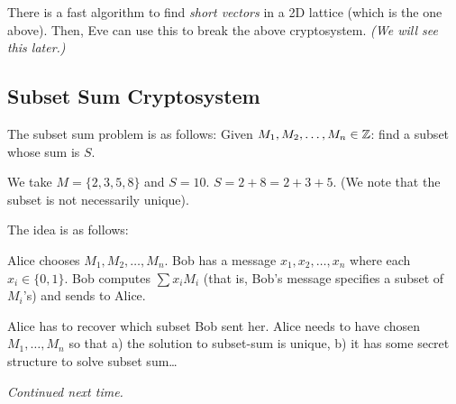 \begin{remark}
    There is a fast algorithm to find \emph{short vectors} in a 2D lattice (which is the one above). Then, Eve can use this to break the above cryptosystem. \emph{(We will see this later.)}
\end{remark}

\subsection{Subset Sum Cryptosystem}
The subset sum problem is as follows: Given $M_1, M_2, \dots, M_n\in\mathbb Z$: find a subset whose sum is $S$.

\begin{example}
    We take $M = \{2, 3, 5, 8\}$ and $S = 10$. $S = 2 + 8 = 2 + 3 + 5$. (We note that the subset is not necessarily unique).
\end{example}

The idea is as follows:

Alice chooses $M_1, M_2, \dots, M_n$. Bob has a message $x_1, x_2, \dots, x_n$ where each $x_i \in \{0, 1\}$. Bob computes $\sum x_i M_i$ (that is, Bob's message specifies a subset of $M_i$'s) and sends to Alice.

Alice has to recover which subset Bob sent her. Alice needs to have chosen $M_1, \dots, M_n$ so that a) the solution to subset-sum is unique, b) it has some secret structure to solve subset sum\dots

\emph{Continued next time. }